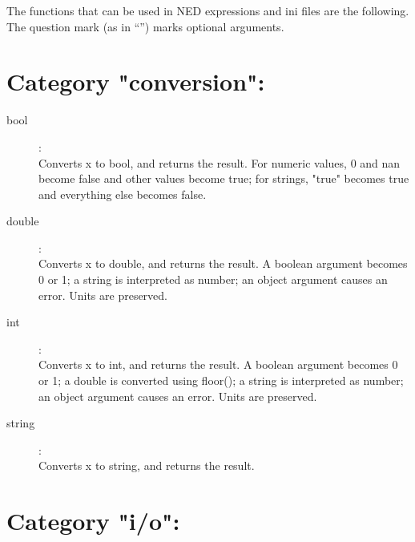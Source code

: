 \label{cha:ned-functions}

The functions that can be used in NED expressions and ini files are the
following. The question mark (as in ``'') marks optional arguments.

%
%

\section{Category "conversion":}
\label{sec:ned-functions:category-conversion}

\begin{description}
\item[bool]:  \\
    Converts x to bool, and returns the result. For numeric values, 0 and nan
    become false and other values become true; for strings, "true" becomes true
    and everything else becomes false.

\item[double]:  \\
    Converts x to double, and returns the result. A boolean argument becomes 0
    or 1; a string is interpreted as number; an object argument causes an
    error. Units are preserved.

\item[int]:  \\
    Converts x to int, and returns the result. A boolean argument becomes 0 or
    1; a double is converted using floor(); a string is interpreted as number;
    an object argument causes an error. Units are preserved.

\item[string]:  \\
    Converts x to string, and returns the result.


\end{description}

\section{Category "i/o":}
\label{sec:ned-functions:category-io}

